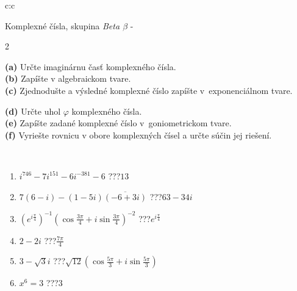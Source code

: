 \documentclass[10pt]{report}
\begin{document}
\begin{tabular}{c:c}
\begin{minipage}[c][104.5mm][t]{0.5\linewidth}
\begin{center}
\vspace{7mm}
{\huge Komplexné čísla, skupina \textit{Beta $\beta$} -}\\[5mm]
\begin{minipage}{0.95\linewidth}
\begin{center}
{\small \begin{multicols}{2} \raggedright
\textbf{(a)} Určte imaginárnu časť komplexného čísla. \\[1mm]
\textbf{(b)} Zapíšte v algebraickom tvare. \\[1mm]
\textbf{(c)} Zjednodušte a výsledné komplexné číslo zapíšte v~exponenciálnom tvare. \par \columnbreak
\textbf{(d)} Určte uhol \(\varphi\) komplexného čísla. \\[1mm]
\textbf{(e)} Zapíšte zadané komplexné číslo v~goniometrickom tvare. \\[1mm]
\textbf{(f)} Vyriešte rovnicu v obore komplexných čísel a určte súčin jej riešení.
\end{multicols}
}
\end{center}
\end{minipage}
\\[4mm]
\begin{minipage}{0.79\linewidth}
\begin{center}
\begin{varwidth}{\linewidth}
\begin{enumerate}
\large
\item $i^{746}-7i^{151}-6i^{-381}-6$\quad \dotfill\; ???\;\dotfill \quad $13$
\item $7(6-i)-(1-5i)\overline{(-6+3i)}$\quad \dotfill\; ???\;\dotfill \quad $63-34i$
\item $\left(e^{i\frac{\pi}{4}}\right)^{-1}\left(\cos{\frac{3\pi}{4}}+i\sin{\frac{3\pi}{4}}\right)^{-2}$\quad \dotfill\; ???\;\dotfill \quad $e^{i\frac{\pi}{4}}$
\item $2-2i$\quad \dotfill\; ???\;\dotfill \quad $\frac{7\pi}{4}$
\item $3-\sqrt{3}i$\quad \dotfill\; ???\;\dotfill \quad $\sqrt{12}\left(\cos{\frac{5\pi}{3}}+i\sin{\frac{5\pi}{3}}\right)$
\item $x^6=3$\quad \dotfill\; ???\;\dotfill \quad $3$
\end{enumerate}
\end{varwidth}

\end{center}
\end{minipage}
\end{center}
\end{minipage}
\end{tabular}
\end{document}
